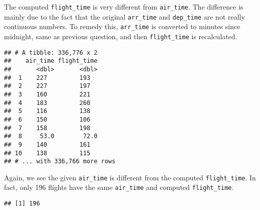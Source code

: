 \documentclass[]{article}
\newenvironment{Shaded}{\begin{snugshade}}{\end{snugshade}}
\newcommand{\KeywordTok}[1]{\textcolor[rgb]{0.13,0.29,0.53}{\textbf{#1}}}
\newcommand{\DataTypeTok}[1]{\textcolor[rgb]{0.13,0.29,0.53}{#1}}
\newcommand{\DecValTok}[1]{\textcolor[rgb]{0.00,0.00,0.81}{#1}}
\newcommand{\StringTok}[1]{\textcolor[rgb]{0.31,0.60,0.02}{#1}}
\newcommand{\OtherTok}[1]{\textcolor[rgb]{0.56,0.35,0.01}{#1}}
\newcommand{\OperatorTok}[1]{\textcolor[rgb]{0.81,0.36,0.00}{\textbf{#1}}}
\newcommand{\NormalTok}[1]{#1}
\theoremstyle{definition}
\theoremstyle{definition}
\theoremstyle{definition}
\theoremstyle{remark}
\begin{document}
The computed \texttt{flight\_time} is very different from
\texttt{air\_time}. The difference is mainly due to the fact that the
original \texttt{arr\_time} and \texttt{dep\_time} are not really
continuous numbers. To remedy this, \texttt{arr\_time} is converted to
minutes since midnight, same as previous question, and then
\texttt{flight\_time} is recalculated.

\begin{Shaded}
\end{Shaded}

\begin{verbatim}
## # A tibble: 336,776 x 2
##    air_time flight_time
##       <dbl>       <dbl>
##  1    227         193  
##  2    227         197  
##  3    160         221  
##  4    183         260  
##  5    116         138  
##  6    150         106  
##  7    158         198  
##  8     53.0        72.0
##  9    140         161  
## 10    138         115  
## # ... with 336,766 more rows
\end{verbatim}

Again, we see the given \texttt{air\_time} is different from the
computed \texttt{flight\_time}. In fact, only 196 flights have the same
\texttt{air\_time} and computed \texttt{flight\_time}.

\begin{Shaded}
\end{Shaded}

\begin{verbatim}
## [1] 196
\end{verbatim}
\end{document}
